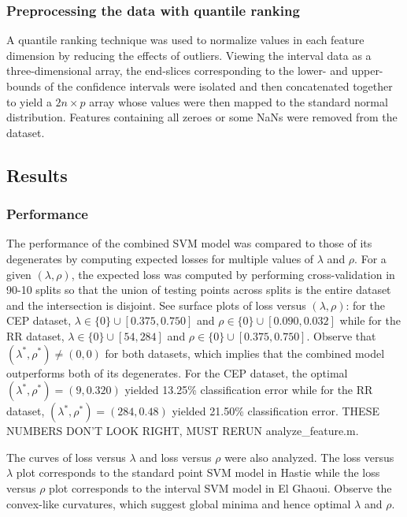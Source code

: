 \documentclass[10pt]{article}
\theoremstyle{definition}
\begin{document}
\subsubsection{Preprocessing the data with quantile ranking}
A quantile ranking technique was used to normalize values in each feature dimension by reducing the effects of outliers. Viewing the interval data as a three-dimensional array, the end-slices corresponding to the lower- and upper-bounds of the confidence intervals were isolated and then concatenated together to yield a $2n\times p$ array whose values were then mapped to the standard normal distribution. Features containing all zeroes or some NaNs were removed from the dataset.

\subsection{Results}

\subsubsection{Performance}
The performance of the combined SVM model was compared to those of its degenerates by computing expected losses for multiple values of $\lambda$ and $\rho$.  For a given $(\lambda,\rho)$, the expected loss was computed by performing cross-validation in 90-10 splits so that the union of testing points across splits is the entire dataset and the intersection is disjoint. See surface plots of loss versus $(\lambda,\rho)$: for the CEP dataset, $\lambda\in \lbrace 0\rbrace\cup [0.375,0.750]$ and $\rho\in\lbrace 0\rbrace\cup [0.090,0.032]$ while for the RR dataset, $\lambda\in\lbrace 0\rbrace\cup [54,284]$ and $\rho\in\lbrace 0\rbrace\cup [0.375,0.750]$. Observe that $(\lambda^*,\rho^*)\neq (0,0)$ for both datasets, which implies that the combined model outperforms both of its degenerates. For the CEP dataset, the optimal $(\lambda^*,\rho^*)=(9,0.320)$ yielded 13.25\% classification error while for the RR dataset, $(\lambda^*,\rho^*)=(284,0.48)$ yielded 21.50\% classification error. THESE NUMBERS DON'T LOOK RIGHT, MUST RERUN analyze\_feature.m.

The curves of loss versus $\lambda$ and loss versus $\rho$ were also analyzed.  The loss versus $\lambda$ plot corresponds to the standard point SVM model in Hastie while the loss versus $\rho$ plot corresponds to the interval SVM model in El Ghaoui. Observe the convex-like curvatures, which suggest global minima and hence optimal $\lambda$ and $\rho$. 
\end{document}
